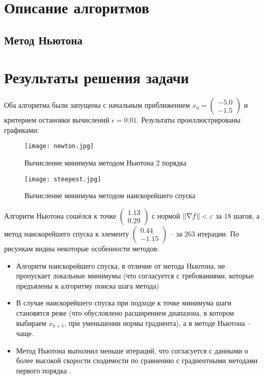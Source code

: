 \documentclass[main.tex]{subfiles}
\begin{document}
\section{Описание алгоритмов}

\subsection{Метод Ньютона}

\section{Результаты решения задачи}
Оба алгоритма были запущены с начальным приближением $x_0=\begin{pmatrix}-5.0\\-1.5\end{pmatrix}$ и критерием остановки вычислений $\epsilon = 0.01$. Результаты проиллюстрированы графиками:
\begin{figure}[H]
	\centering \texttt{[image: newton.jpg]}
	\caption{Вычисление минимума методом Ньютона 2 порядка}
	\label{im:newton}
\end{figure}
\begin{figure}[h]
	\centering \texttt{[image: steepest.jpg]}
	\caption{Вычисление минимума методом наискорейшего спуска}
	\label{im:steepest}
\end{figure}

Алгоритм Ньютона сошёлся к точке $\begin{pmatrix}1.13\\0.29\end{pmatrix}$ с нормой $\left\lVert\nabla f\right\rVert < \varepsilon$ за 18 шагов, а метод наискорейшего спуска к элементу $\begin{pmatrix}0.44\\-1.15\end{pmatrix}$ -- за 263 итерации. По рисункам видны некоторые особенности методов:
\begin{itemize}
	\item Алгоритм наискорейшего спуска, в отличие от метода Ньютона, не пропускает локальные минимумы (что согласуется с требованиями, которые предъялены к алгоритму поиска шага метода)
	\item В случае наискорейшего спуска при подходе к точке минимума шаги становятся реже (что обусловлено расширением диапазона, в котором выбираем $x_{k+1}$, при уменьшении нормы градиента), а в методе Ньютона -- чаще.
	\item Метод Ньютона выполнил меньше итераций, что согласуется с данными о более высокой скорости сходимости по сравнению с градиентными методами первого порядка \cite{boldirev}.
\end{itemize}
\end{document}
